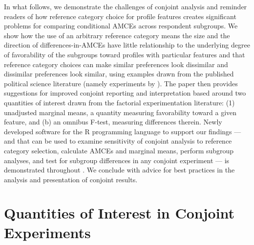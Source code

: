 \documentclass[a4paper,12pt]{article}\usepackage[]{graphicx}\usepackage[]{color}
\begin{document}
In what follows, we demonstrate the challenges of conjoint analysis and reminder readers of how reference category choice for profile features creates significant problems for comparing conditional AMCEs across respondent subgroups. We show how the use of an arbitrary reference category means the size and the direction of differences-in-AMCEs have little relationship to the underlying degree of favorability of the subgroups toward profiles with particular features and that reference category choices can make similar preferences look dissimilar and dissimilar preferences look similar, using examples drawn from the published political science literature (namely experiments by \citealt{HainmuellerHopkinsYamamoto2014, BallardRosaMartinScheve2016, TeeleKallaRosenbluth2018}). The paper then provides suggestions for improved conjoint reporting and interpretation based around two quantities of interest drawn from the factorial experimentation literature: (1) unadjusted marginal means, a quantity measuring favorability toward a given feature, and (b) an omnibus F-test, measuring differences therein. Newly developed software for the R programming language to support our findings --- and that can be used to examine sensitivity of conjoint analysis to reference category selection, calculate AMCEs and marginal means, perform subgroup analyses, and test for subgroup differences in any conjoint experiment --- is demonstrated throughout \citep{Leeper2018cregg}. We conclude with advice for best practices in the analysis and presentation of conjoint results.

\section*{Quantities of Interest in Conjoint Experiments}\label{sec:quantities}
\end{document}
